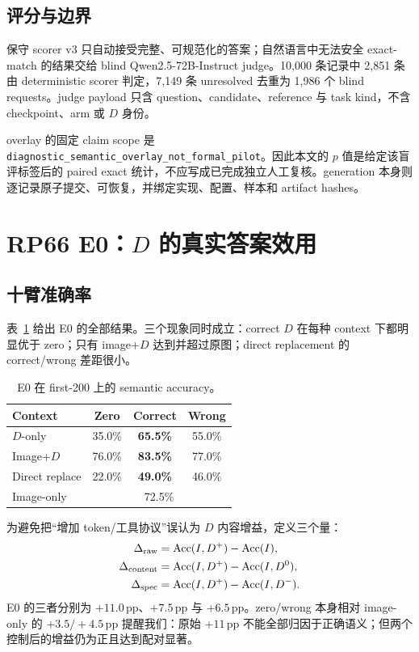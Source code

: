 \documentclass[UTF8,twocolumn,10pt,a4paper]{ctexart}
\newcommand{\Dpos}{D^{+}}
\newcommand{\Dzero}{D^{0}}
\newcommand{\Dwrong}{D^{-}}
\newcommand{\pp}{\,\mathrm{pp}}
\begin{document}
\subsection{评分与边界}

保守 scorer v3 只自动接受完整、可规范化的答案；自然语言中无法安全 exact-match 的结果交给 blind Qwen2.5-72B-Instruct judge。10,000 条记录中 2,851 条由 deterministic scorer 判定，7,149 条 unresolved 去重为 1,986 个 blind requests。judge payload 只含 question、candidate、reference 与 task kind，不含 checkpoint、arm 或 $D$ 身份。

overlay 的固定 claim scope 是 \nolinkurl{diagnostic_semantic_overlay_not_formal_pilot}。因此本文的 $p$ 值是给定该盲评标签后的 paired exact 统计，不应写成已完成独立人工复核。generation 本身则逐记录原子提交、可恢复，并绑定实现、配置、样本和 artifact hashes。

\section{RP66 E0：$D$ 的真实答案效用}

\subsection{十臂准确率}

表~\ref{tab:e0-arms} 给出 E0 的全部结果。三个现象同时成立：correct $D$ 在每种 context 下都明显优于 zero；只有 image+$D$ 达到并超过原图；direct replacement 的 correct/wrong 差距很小。

\begin{table}[t]
\centering
\caption{E0 在 first-200 上的 semantic accuracy。}
\label{tab:e0-arms}
\small
\begin{tabular}{lccc}
\toprule
Context & Zero & Correct & Wrong \\
\midrule
$D$-only & 35.0\% & \textbf{65.5\%} & 55.0\% \\
Image+$D$ & 76.0\% & \textbf{83.5\%} & 77.0\% \\
Direct replace & 22.0\% & \textbf{49.0\%} & 46.0\% \\
\midrule
Image-only & \multicolumn{3}{c}{72.5\%} \\
\bottomrule
\end{tabular}
\end{table}

为避免把“增加 token/工具协议”误认为 $D$ 内容增益，定义三个量：
\begin{align}
 \Delta_{\rm raw}&=\operatorname{Acc}(I,\Dpos)-\operatorname{Acc}(I),\\
 \Delta_{\rm content}&=\operatorname{Acc}(I,\Dpos)-\operatorname{Acc}(I,\Dzero),\\
 \Delta_{\rm spec}&=\operatorname{Acc}(I,\Dpos)-\operatorname{Acc}(I,\Dwrong).
\end{align}
E0 的三者分别为 $+11.0\pp$、$+7.5\pp$ 与 $+6.5\pp$。zero/wrong 本身相对 image-only 的 $+3.5/+4.5\pp$ 提醒我们：原始 $+11\pp$ 不能全部归因于正确语义；但两个控制后的增益仍为正且达到配对显著。
\end{document}
